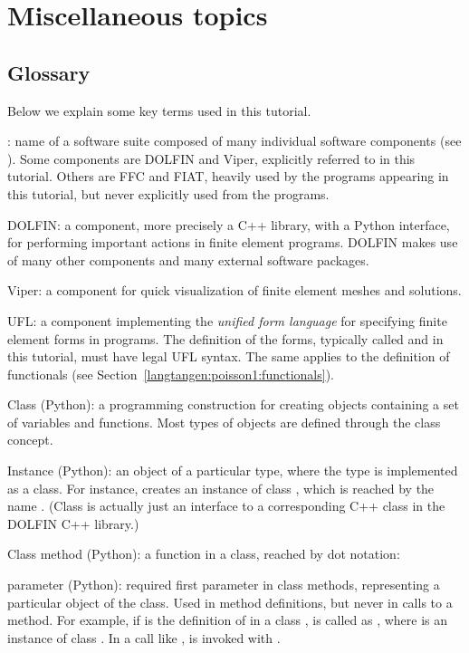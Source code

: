 \section{Miscellaneous topics}

\subsection{Glossary}

Below we explain some key terms used in this tutorial.\gln

\fenics: name of a software suite composed of many individual software
components (see ). Some components are DOLFIN
and Viper, explicitly referred to in this tutorial. Others are FFC and
FIAT, heavily used by the programs appearing in this tutorial, but never
explicitly used from the programs.\gln

DOLFIN: a \fenics{} component, more precisely a C++ library, with a
Python interface, for performing important actions in finite element
programs. DOLFIN makes use of many other \fenics{} components and many
external software packages.\gln

Viper: a \fenics{} component for quick visualization of finite element
meshes and solutions.\gln

UFL: a \fenics{} component implementing the \emph{unified form language}
for specifying finite element forms in \fenics{} programs.  The definition
of the forms, typically called  and  in this tutorial, must
have legal UFL syntax. The same applies to the definition of functionals
(see Section~\ref{langtangen:poisson1:functionals}).  \gln

Class (Python): a programming construction for creating objects containing
a set of variables and functions. Most types of \fenics{} objects are
defined through the class concept.\gln

Instance (Python): an object of a particular type, where the type is
implemented as a class. For instance, 
creates an instance of class , which is reached by the
name . (Class  is actually just an interface
to a corresponding C++ class in the DOLFIN C++ library.)\gln

Class method (Python): a function in a class, reached by dot notation:
\gln

 parameter (Python): required first parameter in class methods,
representing a particular object of the class. Used
in method definitions, but never in calls to a method.  For example,
if  is the definition of  in a class
,  is called as , where 
is an instance of class .  In a call like ,
 is invoked with .\gln

